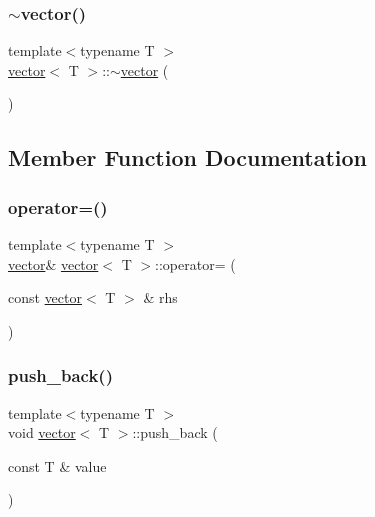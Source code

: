 \mbox{\label{classvector_a7bc236f547bb5debe890fa8ebaabe965}} 
\subsubsection{\texorpdfstring{$\sim$vector()}{~vector()}}
{\footnotesize\ttfamily template$<$typename T $>$ \\
\hyperlink{classvector}{vector}$<$ T $>$\+::$\sim$\hyperlink{classvector}{vector} (\begin{DoxyParamCaption}{ }\end{DoxyParamCaption})\hspace{0.3cm}{\ttfamily [inline]}}



\subsection{Member Function Documentation}
\mbox{\label{classvector_a1a79d01cf69404ebf0e06ea9697790dd}} 
\subsubsection{\texorpdfstring{operator=()}{operator=()}}
{\footnotesize\ttfamily template$<$typename T $>$ \\
\hyperlink{classvector}{vector}\& \hyperlink{classvector}{vector}$<$ T $>$\+::operator= (\begin{DoxyParamCaption}\item[{const \hyperlink{classvector}{vector}$<$ T $>$ \&}]{rhs }\end{DoxyParamCaption})\hspace{0.3cm}{\ttfamily [inline]}}

\mbox{\label{classvector_ad76deb64969b591fe8accbd2f69ea271}} 
\subsubsection{\texorpdfstring{push\+\_\+back()}{push\_back()}}
{\footnotesize\ttfamily template$<$typename T $>$ \\
void \hyperlink{classvector}{vector}$<$ T $>$\+::push\+\_\+back (\begin{DoxyParamCaption}\item[{const T \&}]{value }\end{DoxyParamCaption})\hspace{0.3cm}{\ttfamily [inline]}}

